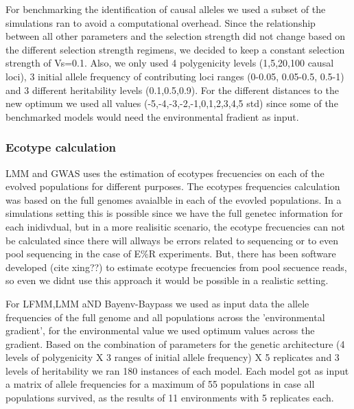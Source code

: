 \documentclass{article}
\begin{document}
For benchmarking the identification of causal alleles we used a subset of the simulations ran to avoid a computational overhead. Since the relationship between all other parameters and the selection strength did not change based on the different selection strength regimens, we decided to keep a constant selection strength of Vs=0.1. Also, we only used 4 polygenicity levels (1,5,20,100 causal loci), 3 initial allele frequency of contributing loci ranges (0-0.05, 0.05-0.5, 0.5-1) and 3 different heritability levels (0.1,0.5,0.9). For the different distances to the new optimum we used all values (-5,-4,-3,-2,-1,0,1,2,3,4,5 std) since some of the benchmarked models would need the environmental fradient as input. 

\subsubsection{Ecotype calculation}  
LMM and GWAS %
uses the estimation of ecotypes frecuencies on each of the evolved populations for different purposes. The ecotypes frequencies calculation was based on the full genomes avaialble in each of the evovled populations. In a simulations setting this is possible since we have the full genetec information for each inidivdual, but in a more realisitic scenario, the ecotype frecuencies can not be calculated since there will allways be errors related to sequencing or to even pool sequencing in the case of E\%R experiments. But, there has been software developed (cite xing??) to estimate ecotype frecuencies from pool secuence reads, so even we didnt use this approach it would be possible in a realistic setting. 

For LFMM,LMM aND Bayenv-Baypass we used as input data the allele frequencies of the full genome and all populations across the 'environmental gradient', for the environmental value we used optimum values across the gradient. Based on the combination of parameters for the genetic architecture (4 levels of polygenicity X 3 ranges of initial allele frequency) X 5 replicates and 3 levels of heritability we ran 180 instances of each model. Each model got as input a matrix of allele frequencies for a maximum of 55 populations in case all populations survived, as the results of 11 environments with 5 replicates each.  
\end{document}

